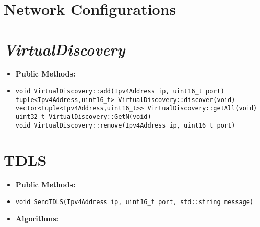 \documentclass[a4paper]{book}
\begin{document}
\section{Network Configurations}


\section{\textit{VirtualDiscovery}}

\begin{itemize}
\item[] \textbf{Public Methods:}
\item[]\begin{verbatim}
void VirtualDiscovery::add(Ipv4Address ip, uint16_t port)
tuple<Ipv4Address,uint16_t> VirtualDiscovery::discover(void)
vector<tuple<Ipv4Address,uint16_t>> VirtualDiscovery::getAll(void)
uint32_t VirtualDiscovery::GetN(void)
void VirtualDiscovery::remove(Ipv4Address ip, uint16_t port)
\end{verbatim}
\end{itemize}

\section{TDLS}
\begin{itemize}
\item[] \textbf{Public Methods:}
\item[]\begin{verbatim}
void SendTDLS(Ipv4Address ip, uint16_t port, std::string message)
\end{verbatim}
\item[] \textbf{Algorithms:}
\end{itemize}
\end{document}
